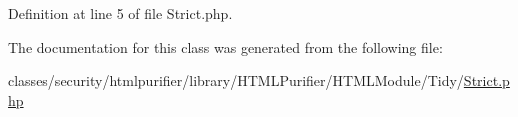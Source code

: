 Definition at line 5 of file Strict.\+php.



The documentation for this class was generated from the following file\+:\begin{DoxyCompactItemize}
\item 
classes/security/htmlpurifier/library/\+H\+T\+M\+L\+Purifier/\+H\+T\+M\+L\+Module/\+Tidy/\hyperlink{Strict_8php}{Strict.\+php}\end{DoxyCompactItemize}
